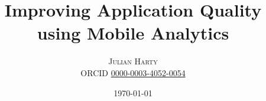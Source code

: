 \documentclass[
	a4paper, %
	fontsize=10pt, %
	twoside=true, %
	numbers=noenddot, %
]{kaobook}
\begin{document}

\subject{PhD Thesis}

\title{Improving Application Quality\\ using Mobile Analytics}
\subtitle{}

\author{\textsc{Julian Harty}\\\small ORCID \href{https://orcid.org/0000-0003-4052-0054}{0000-0003-4052-0054}}

\date{\today}

\publishers{Department of Computing and Communications\\ Faculty of STEM\\ \textsc{The Open University}\\\bigskip\bigskip Supervisors:\\ Arosha Bandara \& Yijun Yu}


\frontmatter %




\makeatletter
\uppertitleback{\@titlehead} %
\end{document}
